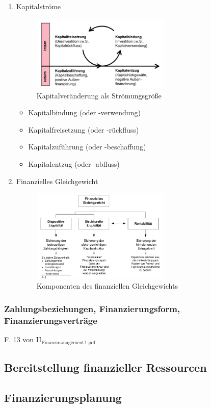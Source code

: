 \documentclass[11pt]{article}
\begin{document}
\begin{enumerate}
\item Kapitalströme
\label{sec:orge449265}
\begin{figure}[htbp]
\centering
\includegraphics[width=250px]{./pictures/kapitalstroeme.png}
\caption{Kapitalveränderung als Strömungsgröße}
\end{figure} 
\begin{itemize}
\item Kapitalbindung (oder -verwendung)
\item Kapitalfreisetzung (oder -rückfluss)
\item Kapitalzuführung (oder -beschaffung)
\item Kapitalentzug (oder -abfluss)
\end{itemize}

\item Finanzielles Gleichgewicht
\label{sec:orgb14dd10}
\begin{figure}[htbp]
\centering
\includegraphics[width=250px]{./pictures/finanzgg.png}
\caption{Komponenten des finanziellen Gleichgewichts}
\end{figure}
\end{enumerate}
\subsubsection{Zahlungsbeziehungen, Finanzierungsform, Finanzierungsverträge}
\label{sec:org3afd6dd}
F. 13 von II\(_{\text{Finanzmanagement}}\)\(_{\text{1.pdf}}\)

\subsection{Bereitstellung finanzieller Ressourcen}
\label{sec:org83d4d78}
\subsection{Finanzierungsplanung}
\label{sec:org5c8db85}
\end{document}
